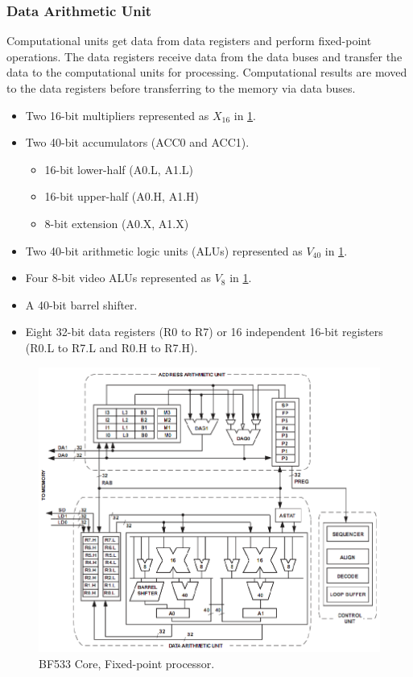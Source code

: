 \subsubsection{Data Arithmetic Unit}
Computational units get data from data registers and perform fixed-point
operations. The data registers receive data from the data buses and transfer the data to the computational units for processing. Computational results
are moved to the data registers before transferring to the memory via data
buses.
\begin{itemize}
	\item Two 16-bit multipliers represented as $X_{16}$ in \ref{fig:7}.
	\item Two 40-bit accumulators (ACC0 and ACC1). 
	\begin{itemize}
		\item 16-bit lower-half (A0.L, A1.L)
		\item 16-bit upper-half (A0.H, A1.H)
		\item 8-bit extension (A0.X, A1.X)
	\end{itemize}
	\item Two 40-bit arithmetic logic units (ALUs) represented as $V_{40}$ in \ref{fig:7}.
	\item Four 8-bit video ALUs represented as $V_8$ in \ref{fig:7}.
	\item A 40-bit barrel shifter.
	\item Eight 32-bit data registers (R0 to R7) or 16 independent 16-bit registers (R0.L to R7.L and R0.H to R7.H).
\end{itemize}

\begin{figure} [H]
	\centering
	\includegraphics[width=\linewidth]{graphics/7.png}
	\caption{BF533 Core, Fixed-point processor.}
	\label{fig:7}
\end{figure}


